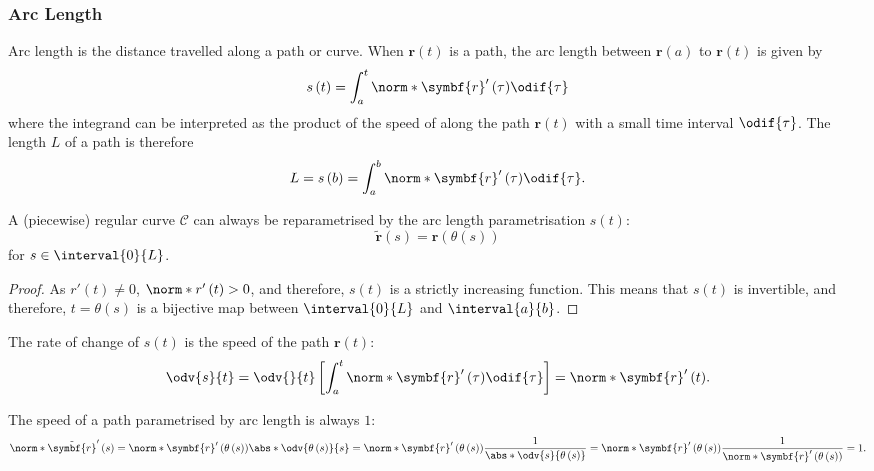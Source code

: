 \documentclass{article}
\begin{document}
\subsubsection{Arc Length}
Arc length is the distance travelled along a path or curve. When
\(\symbf{r}\left( t \right)\) is a path, the arc length between
\(\symbf{r}\left( a \right)\) to \(\symbf{r}\left( t \right)\) is given
by
\begin{equation*}
    s\left( t \right) = \int_a^t \norm*{\symbf{r}'\left( \tau \right)} \odif{\tau}
\end{equation*}
where the integrand can be interpreted as the product of the speed of
along the path \(\symbf{r}\left( t \right)\) with a small time interval
\(\odif{\tau}\).
The length \(L\) of a path is therefore
\begin{equation*}
    L = s\left( b \right) = \int_a^b \norm*{\symbf{r}'\left( \tau \right)} \odif{\tau}.
\end{equation*}
\begin{theorem}
    A (piecewise) regular curve \(\mathscr{C}\) can always be
    reparametrised by the arc length parametrisation \(s\left( t \right)\):
    \begin{equation*}
        \tilde{\symbf{r}}\left( s \right) = \symbf{r}\left( \theta\left( s \right) \right)
    \end{equation*}
    for \(s \in \interval{0}{L}\).
\end{theorem}
\begin{proof}
    As \(r'\left( t \right) \neq 0\), \(\norm*{r'\left( t \right)} > 0\),
    and therefore, \(s\left( t \right)\) is a strictly increasing function.
    This means that \(s\left( t \right)\) is invertible, and therefore,
    \(t = \theta\left( s \right)\) is a bijective map between \(\interval{0}{L}\)
    and \(\interval{a}{b}\).
\end{proof}
\begin{remark}
    The rate of change of \(s\left( t \right)\) is the speed of the
    path \(\symbf{r}\left( t \right)\):
    \begin{equation*}
        \odv{s}{t} = \odv{}{t} \left[ \int_a^t \norm*{\symbf{r}'\left( \tau \right)} \odif{\tau} \right] = \norm*{\symbf{r}'\left( t \right)}.
    \end{equation*}
\end{remark}
\begin{remark}
    The speed of a path parametrised by arc length is always \(1\):
    \begin{equation*}
        \norm*{\tilde{\symbf{r}}'\left( s \right)} = \norm*{\symbf{r}'\left( \theta\left( s \right) \right)} \abs*{\odv{\theta\left( s \right)}{s}} = \norm*{\symbf{r}'\left( \theta\left( s \right) \right)} \frac{1}{\abs*{\odv{s}{\theta\left( s \right)}}} = \norm*{\symbf{r}'\left( \theta\left( s \right) \right)} \frac{1}{\norm*{\symbf{r}'\left( \theta\left( s \right) \right)}} = 1.
    \end{equation*}
\end{remark}
\end{document}
